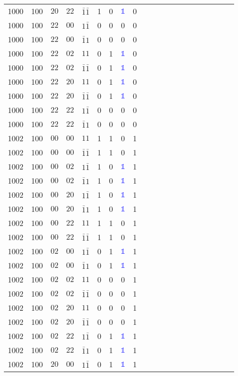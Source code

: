 \begin{longtable*}{c| cccccccccccccccccccc }
1000& 100& $20$& $22$& $\bar{1}\bar{1}$& 1& 0& \textcolor{blue}{$\mathds{1}$}& 0\\
1000& 100& $22$& $00$& $1\bar{1}$& 0& 0& 0& 0\\
1000& 100& $22$& $00$& $\bar{1}1$& 0& 0& 0& 0\\
1000& 100& $22$& $02$& $11$& 0& 1& \textcolor{blue}{$\mathds{1}$}& 0\\
1000& 100& $22$& $02$& $\bar{1}\bar{1}$& 0& 1& \textcolor{blue}{$\mathds{1}$}& 0\\
1000& 100& $22$& $20$& $11$& 0& 1& \textcolor{blue}{$\mathds{1}$}& 0\\
1000& 100& $22$& $20$& $\bar{1}\bar{1}$& 0& 1& \textcolor{blue}{$\mathds{1}$}& 0\\
1000& 100& $22$& $22$& $1\bar{1}$& 0& 0& 0& 0\\
1000& 100& $22$& $22$& $\bar{1}1$& 0& 0& 0& 0\\
1002& 100& $00$& $00$& $11$& 1& 1& 0& 1\\
1002& 100& $00$& $00$& $\bar{1}\bar{1}$& 1& 1& 0& 1\\
1002& 100& $00$& $02$& $1\bar{1}$& 1& 0& \textcolor{blue}{$\mathds{1}$}& 1\\
1002& 100& $00$& $02$& $\bar{1}1$& 1& 0& \textcolor{blue}{$\mathds{1}$}& 1\\
1002& 100& $00$& $20$& $1\bar{1}$& 1& 0& \textcolor{blue}{$\mathds{1}$}& 1\\
1002& 100& $00$& $20$& $\bar{1}1$& 1& 0& \textcolor{blue}{$\mathds{1}$}& 1\\
1002& 100& $00$& $22$& $11$& 1& 1& 0& 1\\
1002& 100& $00$& $22$& $\bar{1}\bar{1}$& 1& 1& 0& 1\\
1002& 100& $02$& $00$& $1\bar{1}$& 0& 1& \textcolor{blue}{$\mathds{1}$}& 1\\
1002& 100& $02$& $00$& $\bar{1}1$& 0& 1& \textcolor{blue}{$\mathds{1}$}& 1\\
1002& 100& $02$& $02$& $11$& 0& 0& 0& 1\\
1002& 100& $02$& $02$& $\bar{1}\bar{1}$& 0& 0& 0& 1\\
1002& 100& $02$& $20$& $11$& 0& 0& 0& 1\\
1002& 100& $02$& $20$& $\bar{1}\bar{1}$& 0& 0& 0& 1\\
1002& 100& $02$& $22$& $1\bar{1}$& 0& 1& \textcolor{blue}{$\mathds{1}$}& 1\\
1002& 100& $02$& $22$& $\bar{1}1$& 0& 1& \textcolor{blue}{$\mathds{1}$}& 1\\
1002& 100& $20$& $00$& $1\bar{1}$& 0& 1& \textcolor{blue}{$\mathds{1}$}& 1\\

\end{longtable*}
